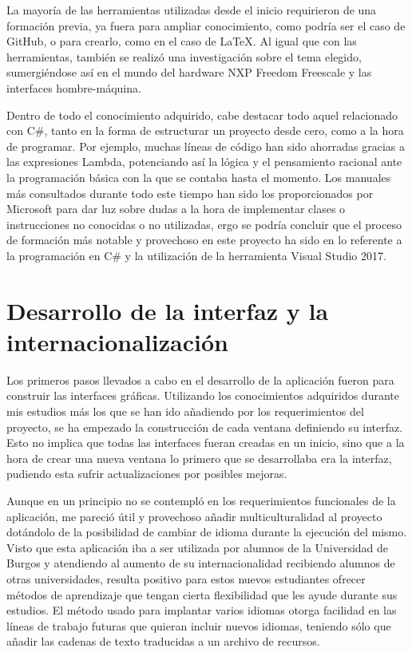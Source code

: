 La mayoría de las herramientas utilizadas desde el inicio requirieron de una formación previa, ya fuera para ampliar conocimiento, como podría ser el caso de GitHub, o para crearlo, como en el caso de \LaTeX. Al igual que con las herramientas, también se realizó una investigación sobre el tema elegido, sumergiéndose así en el mundo del hardware NXP Freedom Freescale y las interfaces hombre-máquina.

Dentro de todo el conocimiento adquirido, cabe destacar todo aquel relacionado con C\#, tanto en la forma de estructurar un proyecto desde cero, como a la hora de programar. Por ejemplo, muchas líneas de código han sido ahorradas gracias a las expresiones Lambda, potenciando así la lógica y el pensamiento racional ante la programación básica con la que se contaba hasta el momento. Los manuales más consultados durante todo este tiempo han sido los proporcionados por Microsoft para dar luz sobre dudas a la hora de implementar clases o instrucciones no conocidas o no utilizadas, ergo se podría concluir que el proceso de formación más notable y provechoso en este proyecto ha sido en lo referente a la programación en C\# y la utilización de la herramienta Visual Studio 2017.

\section{Desarrollo de la interfaz y la internacionalización}

Los primeros pasos llevados a cabo en el desarrollo de la aplicación fueron para construir las interfaces gráficas. Utilizando los conocimientos adquiridos durante mis estudios más los que se han ido añadiendo por los requerimientos del proyecto, se ha empezado la construcción de cada ventana definiendo su interfaz. Esto no implica que todas las interfaces fueran creadas en un inicio, sino que a la hora de crear una nueva ventana lo primero que se desarrollaba era la interfaz, pudiendo esta sufrir actualizaciones por posibles mejoras.

Aunque en un principio no se contempló en los requerimientos funcionales de la aplicación, me pareció útil y provechoso añadir multiculturalidad al proyecto dotándolo de la posibilidad de cambiar de idioma durante la ejecución del mismo. Visto que esta aplicación iba a ser utilizada por alumnos de la Universidad de Burgos y atendiendo al aumento de su internacionalidad recibiendo alumnos de otras universidades, resulta positivo para estos nuevos estudiantes ofrecer métodos de aprendizaje que tengan cierta flexibilidad que les ayude durante sus estudios. El método usado para implantar varios idiomas otorga facilidad en las líneas de trabajo futuras que quieran incluir nuevos idiomas, teniendo sólo que añadir las cadenas de texto traducidas a un archivo de recursos.


